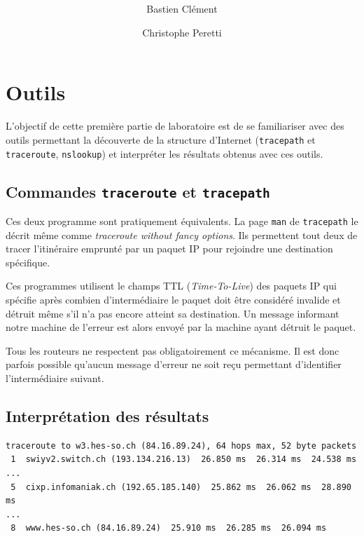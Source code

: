 \documentclass[11pt,a4paper]{article}
\author{Bastien Clément \and Christophe Peretti}
\title{{\normalsize \doccourse} \\ \doctitle }
\begin{document}
\maketitle
\vspace{1em}

\section{Outils}

L'objectif de cette première partie de laboratoire est de se familiariser avec des outils permettant la découverte de la structure d'Internet (\texttt{tracepath} et \texttt{traceroute}, \texttt{nslookup}) et interpréter les résultats obtenus avec ces outils.

\subsection{Commandes \texttt{traceroute} et \texttt{tracepath}}

Ces deux programme sont pratiquement équivalents. La page \texttt{man} de \texttt{tracepath} le décrit même comme \textit{traceroute without fancy options}. Ils permettent tout deux de tracer l'itinéraire emprunté par un paquet IP pour rejoindre une destination spécifique.

Ces programmes utilisent le champs TTL (\textit{Time-To-Live}) des paquets IP qui spécifie après combien d'intermédiaire le paquet doit être considéré invalide et détruit même s'il n'a pas encore atteint sa destination. Un message informant notre machine de l'erreur est alors envoyé par la machine ayant détruit le paquet.

Tous les routeurs ne respectent pas obligatoirement ce mécanisme. Il est donc parfois possible qu'aucun message d'erreur ne soit reçu permettant d'identifier l'intermédiaire suivant.

\subsection{Interprétation des résultats}

\begin{lstlisting}[basicstyle=\small,frame=single]
traceroute to w3.hes-so.ch (84.16.89.24), 64 hops max, 52 byte packets
 1  swiyv2.switch.ch (193.134.216.13)  26.850 ms  26.314 ms  24.538 ms
...
 5  cixp.infomaniak.ch (192.65.185.140)  25.862 ms  26.062 ms  28.890 ms
...
 8  www.hes-so.ch (84.16.89.24)  25.910 ms  26.285 ms  26.094 ms
\end{lstlisting}
\end{document}
